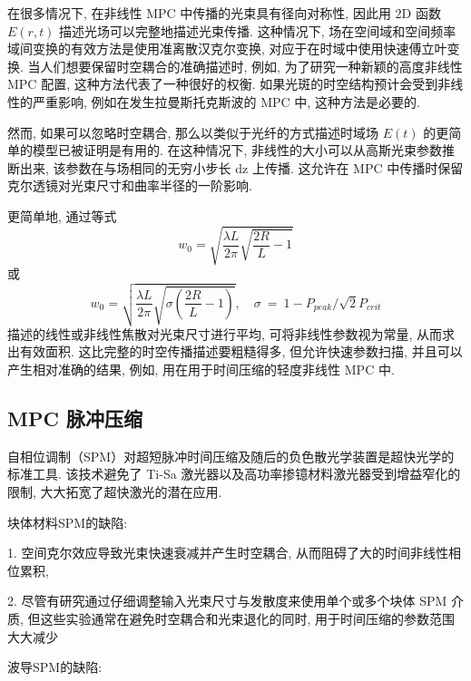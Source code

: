 \documentclass[14pt,a4paper,oneside]{article}
\numberwithin{equation}{subsection}             %
\numberwithin{figure}{subsection}               %
\begin{document}
在很多情况下, 在非线性 MPC 中传播的光束具有径向对称性, 因此用 2D 函数 $E(r,t)$ 描述光场可以完整地描述光束传播. 这种情况下, 场在空间域和空间频率域间变换的有效方法是使用准离散汉克尔变换\cite{guizar-sicairosComputationQuasidiscreteHankel2004}, 对应于在时域中使用快速傅立叶变换. 当人们想要保留时空耦合的准确描述时, 例如, 为了研究一种新颖的高度非线性 MPC 配置, 这种方法代表了一种很好的权衡. 如果光斑的时空结构预计会受到非线性的严重影响, 例如在发生拉曼斯托克斯波的 MPC 中\cite{daherRamanWavelengthConversion2021}, 这种方法是必要的. 

然而, 如果可以忽略时空耦合, 那么以类似于光纤的方式描述时域场 $E(t)$ 的更简单的模型已被证明是有用的\cite{hannaHybridPulsePropagation2020a, daherMultipassCells1D2020}. 在这种情况下, 非线性的大小可以从高斯光束参数推断出来, 该参数在与场相同的无穷小步长 dz 上传播. \cite{hannaHybridPulsePropagation2020a}这允许在 MPC 中传播时保留克尔透镜对光束尺寸和曲率半径的一阶影响. 

更简单地, 通过等式
\begin{equation}
    w_0=\sqrt{\frac{\lambda L}{2\pi}\sqrt{\frac{2R}L-1}}
    \label{eq:1.1.1}
\end{equation}
或
\begin{equation}
    w_0=\sqrt{\frac{\lambda L}{2\pi}\sqrt{\sigma\left(\frac{2R}L-1\right)}},\quad \sigma\:=\:1-P_{peak}/\sqrt2P_{crit}
    \label{eq:1.1.2}
\end{equation}
描述的线性或非线性焦散对光束尺寸进行平均, 可将非线性参数视为常量, 从而求出有效面积. 这比完整的时空传播描述要粗糙得多, 但允许快速参数扫描, 并且可以产生相对准确的结果, 例如, 用在用于时间压缩的轻度非线性 MPC 中. 

\subsection{MPC 脉冲压缩}

自相位调制（SPM）对超短脉冲时间压缩及随后的负色散光学装置是超快光学的标准工具. 该技术避免了 Ti-Sa 激光器以及高功率掺镱材料激光器受到增益窄化的限制, 大大拓宽了超快激光的潜在应用. 

块体材料SPM的缺陷:

1. 空间克尔效应导致光束快速衰减并产生时空耦合, 从而阻碍了大的时间非线性相位累积,

2. 尽管有研究通过仔细调整输入光束尺寸与发散度来使用单个或多个块体 SPM 介质, \cite{seidelAllSolidstateSpectral2016}但这些实验通常在避免时空耦合和光束退化的同时, 用于时间压缩的参数范围大大减少

波导SPM的缺陷:
\end{document}
